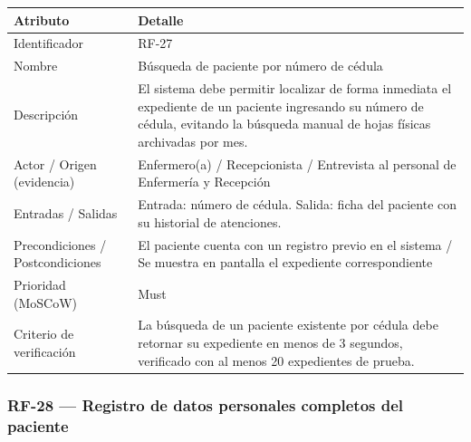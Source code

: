 \documentclass[11pt,a4paper]{article}
\begin{document}
	\begin{longtable}{p{} p{}}
		
		\toprule
		\textbf{Atributo} & \textbf{Detalle} \\
		\midrule
		\endhead
		
		Identificador & RF-27  \\
		Nombre & Búsqueda de paciente por número de cédula \\
		Descripción & El sistema debe permitir localizar de forma inmediata el expediente de un paciente ingresando su número de cédula, evitando la búsqueda manual de hojas físicas archivadas por mes. \\
		Actor / Origen (evidencia) & Enfermero(a) / Recepcionista / Entrevista al personal de Enfermería y Recepción \\
		Entradas / Salidas & Entrada: número de cédula. Salida: ficha del paciente con su historial de atenciones. \\
		Precondiciones / Postcondiciones & El paciente cuenta con un registro previo en el sistema / Se muestra en pantalla el expediente correspondiente \\
		Prioridad (MoSCoW) & Must \\
		Criterio de verificación & La búsqueda de un paciente existente por cédula debe retornar su expediente en menos de 3 segundos, verificado con al menos 20 expedientes de prueba. \\
		\bottomrule
	\end{longtable}
	
	\subsubsection{RF-28 --- Registro de datos personales completos del paciente}
	
\end{document}
